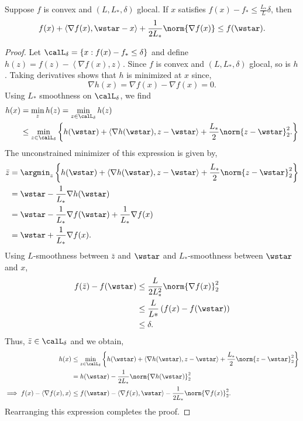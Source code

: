 \documentclass[10pt]{article} %
\newcommand{\fstar}{f_*}
\newcommand{\grad}{\nabla{} f}
\newcommand{\rbr}[1]{\left(#1\right)}
\newcommand{\cbr}[1]{\left\{#1\right\}}
\newcommand{\abr}[1]{\left\langle#1\right\rangle}
\begin{document}
\iffalse
\begin{lemma}\label{lemma:restricted-dual-sc}
    Suppose \( f \) is convex and \( (L, L_*, \delta) \) glocal.
    If \( x \) satisfies \( f(x) - \fstar \leq \frac{L_*}{L} \delta \), then 
    \begin{align*}
        f(x) + \abr{\grad(x), \wstar - x} + \frac{1}{2L_*} \norm{\grad(x)}
        \leq f(\wstar).
    \end{align*}
\end{lemma}
\begin{proof}
    Let \( \calL_{\delta} = \cbr{x : f(x) - \fstar \leq \delta} \) and
    define \( h(z) = f(z) - \abr{\grad(x), z} \).
    Since \( f \) is convex and \( (L, L_*, \delta) \) glocal, so is \( h \).
    Taking derivatives shows that \( h \) is minimized at \( x \) since,
    \[
        \nabla h(x) = \grad(x) - \grad(x) = 0.
    \]
    Using \( L_* \) smoothness on \( \calL_{\delta} \), we find
    \begin{align*}
        h(x)
         & = \min_{z} h(z)
        = \min_{z \in \calL_\delta} h(z)  \\
         & \leq \min_{z \in \calL_\delta}
        \cbr{
            h(\wstar) + \abr{\nabla h(\wstar), z - \wstar} + \frac{L_*}{2}\norm{z - \wstar}_2^2.
        }
    \end{align*}
    The unconstrained minimizer of this expression is given by,
    \begin{align*}
        \bar z
         & = \argmin_{z}
        \cbr{
            h(\wstar) + \abr{\nabla h(\wstar), z - \wstar} + \frac{L_*}{2}\norm{z - \wstar}_2^2
        }                                                         \\
         & =  \wstar - \frac{1}{L_*} \nabla h(\wstar)                       \\
         & =  \wstar - \frac{1}{L_*} \grad(\wstar) + \frac{1}{L_*} \grad(x) \\
         & =  \wstar + \frac{1}{L_*} \grad(x).
    \end{align*}
    Using \( L \)-smoothness between \( \bar z \) and \( \wstar \) and 
    \( L_* \)-smoothness between \( \wstar \) and \( x \),
    \begin{align*}
       f(\bar z) - f(\wstar)
       &\leq \frac{L}{2L_*^2}\norm{\grad(x)}_2^2\\
       &\leq \frac{L}{L*}\rbr{f(x) - f(\wstar)}\\
       &\leq \delta.
    \end{align*}
    Thus, \( \bar z \in \calL_\delta \) and we obtain,
    \begin{align*}
        h(x)
         & \leq \min_{z \in \calL_\delta}
        \cbr{
            h(\wstar) + \abr{\nabla h(\wstar), z - \wstar} + \frac{L_*}{2}\norm{z - \wstar}_2^2
        }\\
         &= h(\wstar) - \frac{1}{2L_*} \norm{\nabla h(\wstar)}_2^2\\
         \implies f(x) - \abr{\grad(x), x} 
         &\leq f(\wstar) - \abr{\grad(x), \wstar} - \frac{1}{2L_*} \norm{\grad(x)}_2^2.
    \end{align*}
    Rearranging this expression completes the proof.
\end{proof}
\end{document}
